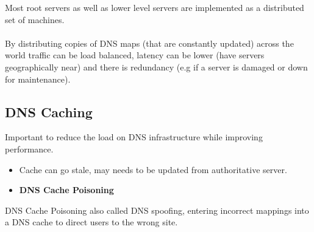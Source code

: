 Most root servers as well as lower level servers are implemented as a distributed set of machines.
\\
\\ By distributing copies of DNS maps (that are constantly updated) across the world traffic can be load balanced, latency can be lower (have servers geographically near) and there is redundancy (e.g if a server is damaged or down for maintenance).
\subsection{DNS Caching}
Important to reduce the load on DNS infrastructure while improving performance.
\begin{itemize}
    \setlength\itemsep{0em}
    \item Cache can go stale, may needs to be updated from authoritative server.
    \item \textbf{DNS Cache Poisoning}
\end{itemize}

\begin{sidenotebox}{DNS Cache Poisoning}
    also called DNS spoofing, entering incorrect mappings into a DNS cache to direct users to the wrong site.
\end{sidenotebox}

